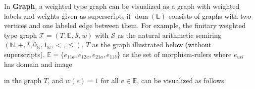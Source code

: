 \begin{example}
    \label{example:wft:weighted_type_graph}
     In \textbf{Graph}, a weighted type graph can be visualized as a graph with weighted labels and weights given as superscripts if $\operatorname{dom}(\mathbb{E})$ consists of graphs with two vertices and one labeled edge between them. For example, the finitary weighted type graph $\mathcal{T} = (T, \mathbb{E}, \mathcal{S}, w)$ with $\mathcal{S}$ as the natural arithmetic semiring $(\mathbb{N}, +, *, 0_\mathbb{N}, 1_\mathbb{N}, <,\leq)$,
     $T$ as the graph illustrated below (without superscripts), $\mathbb{E}=\{e_{11a},e_{12a},e_{21a},e_{11b}\}$ as the set of morphism-rulers where 
     $e_{uvl}$ has domain 
      and image 
     in the graph $T$,
    and $w(e) = 1$ for all $e \in \mathbb{E}$, can be visualized as follows:
    \begin{center}
    \end{center}
\end{example}